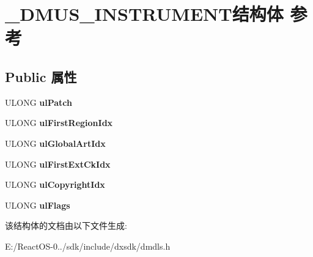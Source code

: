 \hypertarget{struct___d_m_u_s___i_n_s_t_r_u_m_e_n_t}{}\section{\+\_\+\+D\+M\+U\+S\+\_\+\+I\+N\+S\+T\+R\+U\+M\+E\+N\+T结构体 参考}
\label{struct___d_m_u_s___i_n_s_t_r_u_m_e_n_t}
\subsection*{Public 属性}
\begin{DoxyCompactItemize}
\item 
\mbox{\label{struct___d_m_u_s___i_n_s_t_r_u_m_e_n_t_aa3c9408d39fb18372d589a5bfbd69abc}} 
U\+L\+O\+NG {\bfseries ul\+Patch}
\item 
\mbox{\label{struct___d_m_u_s___i_n_s_t_r_u_m_e_n_t_a4356d67e8b97367adc9fcb8e1d73fab5}} 
U\+L\+O\+NG {\bfseries ul\+First\+Region\+Idx}
\item 
\mbox{\label{struct___d_m_u_s___i_n_s_t_r_u_m_e_n_t_aa562939ca2d176b3a751b81d0fff6b5a}} 
U\+L\+O\+NG {\bfseries ul\+Global\+Art\+Idx}
\item 
\mbox{\label{struct___d_m_u_s___i_n_s_t_r_u_m_e_n_t_ab574dc31fa1cd6cdaa9e698edeb2748f}} 
U\+L\+O\+NG {\bfseries ul\+First\+Ext\+Ck\+Idx}
\item 
\mbox{\label{struct___d_m_u_s___i_n_s_t_r_u_m_e_n_t_ab91878eea804d273dadc252a7e3f4e2c}} 
U\+L\+O\+NG {\bfseries ul\+Copyright\+Idx}
\item 
\mbox{\label{struct___d_m_u_s___i_n_s_t_r_u_m_e_n_t_a0dbe5cfac7b3778a20754fafc88811a3}} 
U\+L\+O\+NG {\bfseries ul\+Flags}
\end{DoxyCompactItemize}


该结构体的文档由以下文件生成\+:\begin{DoxyCompactItemize}
\item 
E\+:/\+React\+O\+S-\/0../sdk/include/dxsdk/dmdls.\+h\end{DoxyCompactItemize}
